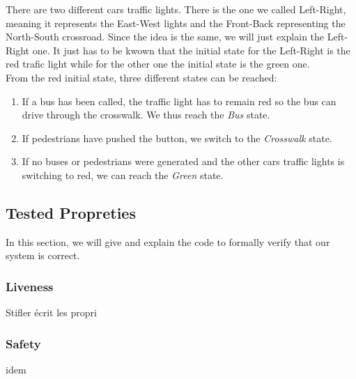 There are two different cars traffic lights. There is the one we called Left-Right, meaning it represents the East-West lights and the Front-Back representing the North-South crossroad. Since the idea is the same, we will just explain the Left-Right one. It just has to be kwown that the initial state for the Left-Right is the red trafic light while for the other one the initial state is the green one. \\

From the red initial state, three different states can be reached:
\begin{enumerate}
  \item If a bus has been called, the traffic light has to remain red so the bus can drive through the crosswalk. We thus reach the \textit{Bus} state.
  \item If pedestrians have pushed the button, we switch to the \textit{Crosswalk} state.
  \item If no buses or pedestrians were generated and the other cars traffic lights is switching to red, we can reach the \textit{Green} state.
\end{enumerate}

\subsection{Tested Propreties}
In this section, we will give and explain the code to formally verify that our system is correct.

\subsubsection{Liveness}
Stifler écrit les propri
\subsubsection{Safety} 
idem